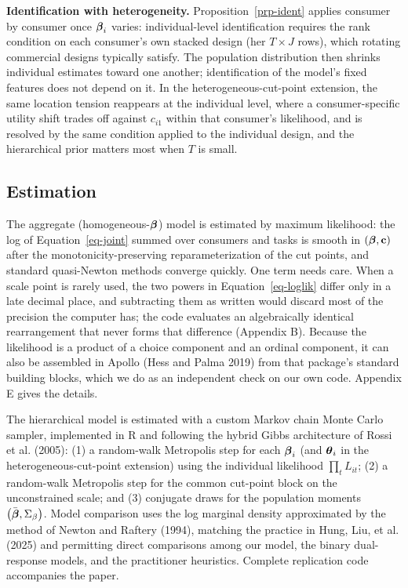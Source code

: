 \documentclass[
  letterpaper,
  DIV=11,
  numbers=noendperiod]{scrartcl}
\theoremstyle{plain}
\theoremstyle{plain}
\theoremstyle{plain}
\theoremstyle{remark}
\begin{document}
\textbf{Identification with heterogeneity.} Proposition~\ref{prp-ident}
applies consumer by consumer once \(\boldsymbol{\beta}_i\) varies: individual-level
identification requires the rank condition on each consumer's own
stacked design (her \(T \times J\) rows), which rotating commercial
designs typically satisfy. The population distribution then shrinks
individual estimates toward one another; identification of the model's
fixed features does not depend on it. In the heterogeneous-cut-point
extension, the same location tension reappears at the individual level,
where a consumer-specific utility shift trades off against \(c_{i1}\)
within that consumer's likelihood, and is resolved by the same condition
applied to the individual design, and the hierarchical prior matters
most when \(T\) is small.

\subsection{Estimation}\label{sec-estimation}

The aggregate (homogeneous-\(\boldsymbol{\beta}\)) model is estimated by maximum
likelihood: the log of Equation~\ref{eq-joint} summed over consumers and
tasks is smooth in \(\left( \boldsymbol{\beta}, \mathbf{c} \right)\) after the
monotonicity-preserving reparameterization of the cut points, and
standard quasi-Newton methods converge quickly. One term needs care.
When a scale point is rarely used, the two powers in
Equation~\ref{eq-loglik} differ only in a late decimal place, and
subtracting them as written would discard most of the precision the
computer has; the code evaluates an algebraically identical
rearrangement that never forms that difference (Appendix B). Because the
likelihood is a product of a choice component and an ordinal component,
it can also be assembled in Apollo (Hess and Palma 2019) from that
package's standard building blocks, which we do as an independent check
on our own code. Appendix E gives the details.

The hierarchical model is estimated with a custom Markov chain Monte
Carlo sampler, implemented in R and following the hybrid Gibbs
architecture of Rossi et al. (2005): (1) a random-walk Metropolis step
for each \(\boldsymbol{\beta}_i\) (and \(\boldsymbol{\theta}_i\) in the
heterogeneous-cut-point extension) using the individual likelihood
\(\prod_t L_{it}\); (2) a random-walk Metropolis step for the common
cut-point block on the unconstrained scale; and (3) conjugate draws for
the population moments \(\left( \bar{\boldsymbol{\beta}}, \Sigma_{\beta} \right)\).
Model comparison uses the log marginal density approximated by the
method of Newton and Raftery (1994), matching the practice in Hung, Liu,
et al. (2025) and permitting direct comparisons among our model, the
binary dual-response models, and the practitioner heuristics. Complete
replication code accompanies the paper.
\end{document}
